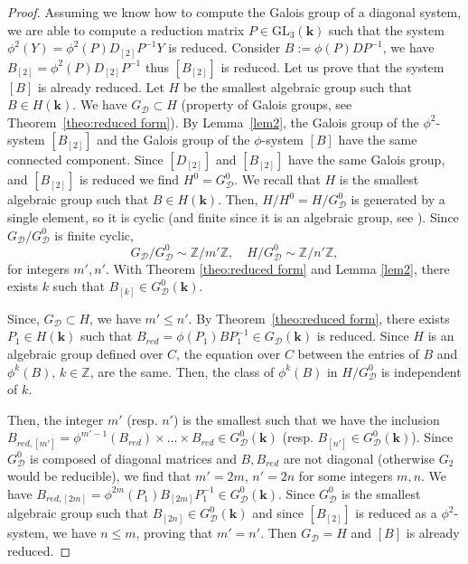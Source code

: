 \documentclass[a4paper,11pt]{amsart}
\renewcommand{\leq}{\leqslant}
\newcommand{\Gdiag}{G_{\mathcal{D}}}
\def\k{\mathbf{k}}
\def\Z{\mathbb{Z}}
\begin{document}
\begin{proof}
Assuming we know how to compute the Galois group of a diagonal system,  we are able to compute a reduction  matrix $P\in \mathrm{GL}_{3}(\k)$ such that the system $\phi^2(Y) = \phi^2(P)D_{[2]}P^{-1}Y $ is reduced.  Consider $B:=\phi(P)DP^{-1}$, we have $B_{[2]}=\phi^2(P)D_{[2]}P^{-1}$ thus $[B_{[2]}]$ is reduced.    Let us prove that the system $[B]$ is already reduced.
  Let $H$ be the smallest algebraic group such that $B\in H(\k)$.  We have $\Gdiag\subset H$ (property of Galois groups, see Theorem~\ref{theo:reduced form}).
By Lemma~\ref{lem2},  the Galois group of the $\phi^2$-system $[B_{[2]}]$ and the Galois group of the $\phi$-system $[B]$ have the same connected component.  Since $[D_{[2]}]$  and $[B_{[2]}]$  have the same Galois group, and $[B_{[2]}]$  is reduced  we find 
$H^0=\Gdiag^0$.  We recall that $H$ is the smallest algebraic group such that $B\in H(\k)$. Then, $H/H^0=H/\Gdiag^0$ is generated by a single element, so it is cyclic (and finite since it is an algebraic group,  see \cite[Lemma 3.5]{hardouin2016galois}). 
Since $\Gdiag/\Gdiag^0$ is finite cyclic, 
$$
\Gdiag /\Gdiag^0 \sim  \Z/ m' \Z , \quad 
H/\Gdiag^0 \sim  \Z/ n' \Z,  
$$
for integers $m',n'$.   
 With Theorem \ref{theo:reduced form} and Lemma \ref{lem2}, there exists $k$ such that $B_{[k]}\in  \Gdiag^0 (\k)$.  
 
Since, $\Gdiag\subset H$,  we have   $m'\leq n'$.  By Theorem~\ref{theo:reduced form}, there exists $P_1\in H(\k)$ such that $B_{red}=\phi(P_1)BP_{1}^{-1}\in \Gdiag (\k)$ is reduced.  
 Since $H$ is an algebraic group defined over $C$, the equation over $C$ between the entries of $B$ and  $\phi^{k}(B)$, $k\in \Z$, are the same. Then, the class of $\phi^{k}(B)$ in $H/\Gdiag^0$ is independent of $k$. 
 
 Then, the  integer $m'$ (resp. $n'$) is the smallest such that we have the inclusion ${B_{red,[m']}=\phi^{m'-1}(B_{red})\times \dots \times B_{red}
\in \Gdiag^0 (\k)}$ (resp.  $B_{[n']}
\in \Gdiag^0 (\k)$).  Since $\Gdiag^0$ is composed of diagonal matrices and $B,B_{red}$ are not diagonal (otherwise $G_2$ would be reducible),  we find that $m'=2m$, $n'=2n$ for some integers $m,n$. 
We have $B_{red,[2m]}=\phi^{2m}(P_{1})B_{[2m]}P_{1}^{-1} \in \Gdiag^0(\k)$.
 Since $\Gdiag^0 $ is the smallest algebraic group such that  $B_{[2n]}\in \Gdiag^0 (\k)$
  and since $[B_{[2]}]$ is reduced as a $\phi^2$-system,  we have  $n\leq m$,  proving that $m'=n'$.  Then $\Gdiag=H$ and $[B]$ is already reduced. 
 
\medskip
  

\end{proof}
\end{document}
